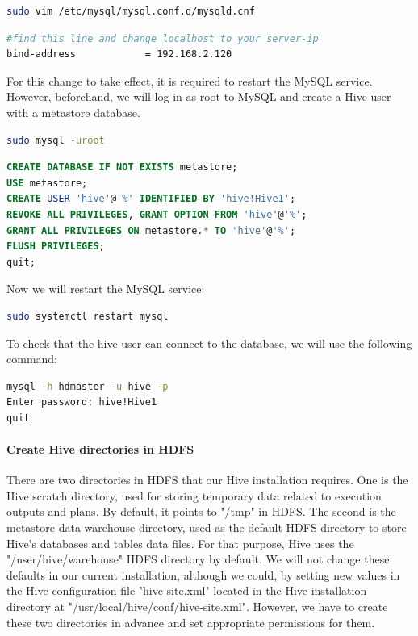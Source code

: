 \documentclass[12pt,english]{book}
\begin{document}
\begin{lstlisting}[language=bash, frame=single, basicstyle=\footnotesize]
sudo vim /etc/mysql/mysql.conf.d/mysqld.cnf 
\end{lstlisting}

\begin{lstlisting}[language=bash, frame=single, basicstyle=\footnotesize]
#find this line and change localhost to your server-ip
bind-address            = 192.168.2.120
\end{lstlisting}

For this change to take effect, it is required to restart the MySQL service.
However, beforehand, we will log in as root to MySQL and create a Hive user with a metastore database.

\begin{lstlisting}[language=bash, frame=single, basicstyle=\footnotesize]
sudo mysql -uroot
\end{lstlisting}

\begin{lstlisting}[language=SQL, frame=single, basicstyle=\footnotesize, breaklines=true, postbreak=\mbox{\textcolor{red}{$\hookrightarrow$}\space}]
CREATE DATABASE IF NOT EXISTS metastore;
USE metastore;
CREATE USER 'hive'@'%' IDENTIFIED BY 'hive!Hive1';
REVOKE ALL PRIVILEGES, GRANT OPTION FROM 'hive'@'%';
GRANT ALL PRIVILEGES ON metastore.* TO 'hive'@'%';
FLUSH PRIVILEGES;
quit;
\end{lstlisting}

Now we will restart the MySQL service:

\begin{lstlisting}[language=bash, frame=single, basicstyle=\footnotesize]
sudo systemctl restart mysql
\end{lstlisting}

To check that the hive user can connect to the database, we will use the following command:

\begin{lstlisting}[language=bash, frame=single, basicstyle=\footnotesize]
mysql -h hdmaster -u hive -p
Enter password: hive!Hive1
quit
\end{lstlisting}

\paragraph{Create Hive directories in HDFS}

There are two directories in HDFS that our Hive installation requires.
One is the Hive scratch directory, used for storing temporary data related to execution outputs and plans.
By default, it points to "/tmp" in HDFS.
The second is the metastore data warehouse directory, used as the default HDFS directory to store Hive's databases and tables data files.
For that purpose, Hive uses the "/user/hive/warehouse" HDFS directory by default.
We will not change these defaults in our current installation, although we could, by setting new values in the Hive configuration file "hive-site.xml" located in the Hive installation directory at "/usr/local/hive/conf/hive-site.xml".
However, we have to create these two directories in advance and set appropriate permissions for them.
\end{document}
